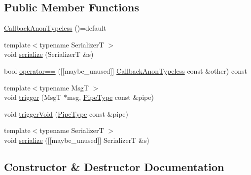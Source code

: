 \subsection*{Public Member Functions}
\begin{DoxyCompactItemize}
\item 
\hyperlink{structvt_1_1pipe_1_1callback_1_1_callback_anon_typeless_ae0512a558dbda7fcbd2a9586138c7c28}{Callback\+Anon\+Typeless} ()=default
\item 
{\footnotesize template$<$typename SerializerT $>$ }\\void \hyperlink{structvt_1_1pipe_1_1callback_1_1_callback_anon_typeless_addd1f3e4d50d38e98e3d4c9f7584d3b0}{serialize} (SerializerT \&s)
\item 
bool \hyperlink{structvt_1_1pipe_1_1callback_1_1_callback_anon_typeless_ac42a80ee538c86c2fb6f7e42b6e374b9}{operator==} (\mbox{[}\mbox{[}maybe\+\_\+unused\mbox{]}\mbox{]} \hyperlink{structvt_1_1pipe_1_1callback_1_1_callback_anon_typeless}{Callback\+Anon\+Typeless} const \&other) const
\item 
{\footnotesize template$<$typename MsgT $>$ }\\void \hyperlink{structvt_1_1pipe_1_1callback_1_1_callback_anon_typeless_a2e1e8131140825b88645a268ecc03053}{trigger} (MsgT $\ast$msg, \hyperlink{namespacevt_ac9852acda74d1896f48f406cd72c7bd3}{Pipe\+Type} const \&pipe)
\item 
void \hyperlink{structvt_1_1pipe_1_1callback_1_1_callback_anon_typeless_a6e43221631749153baf51d80be27cad2}{trigger\+Void} (\hyperlink{namespacevt_ac9852acda74d1896f48f406cd72c7bd3}{Pipe\+Type} const \&pipe)
\item 
{\footnotesize template$<$typename SerializerT $>$ }\\void \hyperlink{structvt_1_1pipe_1_1callback_1_1_callback_anon_typeless_ad57ae2f5541fa4b0a4e1f3477c89d5ee}{serialize} (\mbox{[}\mbox{[}maybe\+\_\+unused\mbox{]}\mbox{]} SerializerT \&s)
\end{DoxyCompactItemize}


\subsection{Constructor \& Destructor Documentation}
\mbox{\label{structvt_1_1pipe_1_1callback_1_1_callback_anon_typeless_ae0512a558dbda7fcbd2a9586138c7c28}} 
